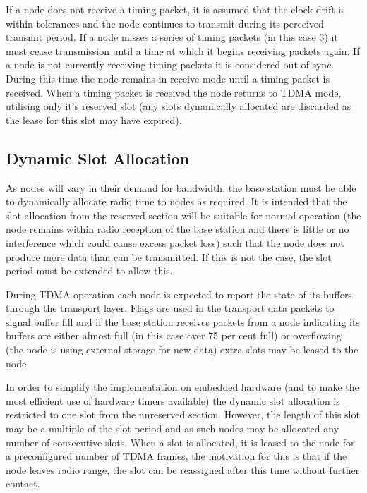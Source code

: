 \documentclass[parskip]{cs4rep}
\begin{document}
If a node does not receive a timing packet, it is assumed that the clock drift is within tolerances and the node continues to transmit during its perceived transmit period. If a node misses a series of timing packets (in this case 3) it must cease transmission until a time at which it begins receiving packets again. If a node is not currently receiving timing packets it is considered out of sync. During this time the node remains in receive mode until a timing packet is received. When a timing packet is received the node returns to TDMA mode, utilising only it’s reserved slot (any slots dynamically allocated are discarded as the lease for this slot may have expired).

\subsection{Dynamic Slot Allocation}

As nodes will vary in their demand for bandwidth, the base station must be able to dynamically allocate radio time to nodes as required. It is intended that the slot allocation from the reserved section will be suitable for normal operation (the node remains within radio reception of the base station and there is little or no interference which could cause excess packet loss) such that the node does not produce more data than can be transmitted. If this is not the case, the slot period must be extended to allow this.

During TDMA operation each node is expected to report the state of its buffers through the transport layer. Flags are used in the transport data packets to signal buffer fill and if the base station receives packets from a node indicating its buffers are either almost full (in this case over 75 per cent full) or overflowing (the node is using external storage for new data) extra slots may be leased to the node.

In order to simplify the implementation on embedded hardware (and to make the most efficient use of hardware timers available) the dynamic slot allocation is restricted to one slot from the unreserved section. However, the length of this slot may be a multiple of the slot period and as such nodes may be allocated any number of consecutive slots. When a slot is allocated, it is leased to the node for a preconfigured number of TDMA frames, the motivation for this is that if the node leaves radio range, the slot can be reassigned after this time without further contact.
\end{document}
